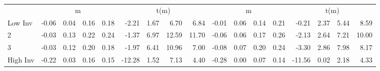 \begin{table}[!ht]
\begin{tabular}{lrrrrrrrrrrrrrrrr}
  
    
      & \multicolumn{4}{c}{m} & \multicolumn{4}{c}{t(m)}
    
      & \multicolumn{4}{c}{m} & \multicolumn{4}{c}{t(m)}
    
    \\
      \cmidrule(r){2-5} \cmidrule(r){6-9} \cmidrule(r){10-13} \cmidrule(r){14-17}

    Low Inv   & -0.06  & 0.04  & 0.16  & 0.18  & -2.21  & 1.67  & 6.70  & 6.84  & -0.01  & 0.06  & 0.14  & 0.21  & -0.21  & 2.37  & 5.44  & 8.59  \\
           2  & -0.03  & 0.13  & 0.22  & 0.24  & -1.37  & 6.97  & 12.59  & 11.70  & -0.06  & 0.06  & 0.17  & 0.26  & -2.13  & 2.64  & 7.21  & 10.00  \\
           3  & -0.03  & 0.12  & 0.20  & 0.18  & -1.97  & 6.41  & 10.96  & 7.00  & -0.08  & 0.07  & 0.20  & 0.24  & -3.30  & 2.86  & 7.98  & 8.17  \\
    High Inv  & -0.22  & 0.03  & 0.16  & 0.15  & -12.28  & 1.52  & 7.13  & 4.40  & -0.28  & 0.00  & 0.07  & 0.14  & -11.56  & 0.02  & 2.18  & 4.33  \\

  

  \bottomrule
\end{tabular}
\label{tbl:32_Size_BM_Inv_C1997b}
\end{table}